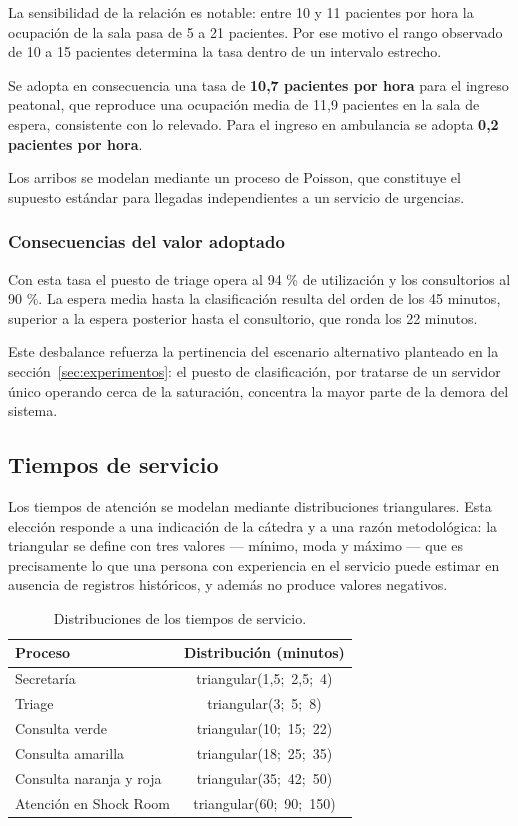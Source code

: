 \documentclass{article}
\begin{document}
La sensibilidad de la relación es notable: entre 10 y 11 pacientes por hora la
ocupación de la sala pasa de 5 a 21 pacientes. Por ese motivo el rango
observado de 10 a 15 pacientes determina la tasa dentro de un intervalo
estrecho.

Se adopta en consecuencia una tasa de \textbf{10,7 pacientes por hora} para el
ingreso peatonal, que reproduce una ocupación media de 11,9 pacientes en la
sala de espera, consistente con lo relevado. Para el ingreso en ambulancia se
adopta \textbf{0,2 pacientes por hora}.

Los arribos se modelan mediante un proceso de Poisson, que constituye el
supuesto estándar para llegadas independientes a un servicio de urgencias.

\subsubsection*{Consecuencias del valor adoptado}

Con esta tasa el puesto de triage opera al 94 \% de utilización y los
consultorios al 90 \%. La espera media hasta la clasificación resulta del
orden de los 45 minutos, superior a la espera posterior hasta el consultorio,
que ronda los 22 minutos.

Este desbalance refuerza la pertinencia del escenario alternativo planteado en
la sección~\ref{sec:experimentos}: el puesto de clasificación, por tratarse de
un servidor único operando cerca de la saturación, concentra la mayor parte de
la demora del sistema.

\subsection{Tiempos de servicio}

Los tiempos de atención se modelan mediante distribuciones triangulares. Esta
elección responde a una indicación de la cátedra y a una razón metodológica:
la triangular se define con tres valores --- mínimo, moda y máximo --- que es
precisamente lo que una persona con experiencia en el servicio puede estimar
en ausencia de registros históricos, y además no produce valores negativos.

\begin{table}[H]
\centering
\begin{tabular}{lc}
\toprule
\textbf{Proceso} & \textbf{Distribución (minutos)} \\
\midrule
Secretaría                  & triangular(1,5;\ 2,5;\ 4) \\
Triage                      & triangular(3;\ 5;\ 8) \\
Consulta verde              & triangular(10;\ 15;\ 22) \\
Consulta amarilla           & triangular(18;\ 25;\ 35) \\
Consulta naranja y roja     & triangular(35;\ 42;\ 50) \\
Atención en Shock Room      & triangular(60;\ 90;\ 150) \\
\bottomrule
\end{tabular}
\caption{Distribuciones de los tiempos de servicio.}
\label{tab:tiempos}
\end{table}
\end{document}
